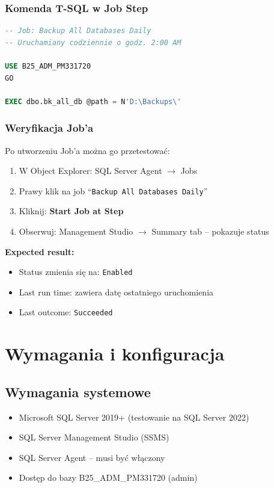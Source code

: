 \documentclass[a4paper,11pt]{article}
\begin{document}
	\subsubsection{Komenda T-SQL w Job Step}
	
	\begin{lstlisting}[language=SQL]
-- Job: Backup All Databases Daily
-- Uruchamiany codziennie o godz. 2:00 AM

USE B25_ADM_PM331720
GO

EXEC dbo.bk_all_db @path = N'D:\Backups\'
	\end{lstlisting}
	
	\subsubsection{Weryfikacja Job'a}
	
	Po utworzeniu Job'a można go przetestować:
	
	\begin{enumerate}
		\item W Object Explorer: SQL Server Agent $\rightarrow$ Jobs
		\item Prawy klik na job ``\texttt{Backup All Databases Daily}''
		\item Kliknij: \textbf{Start Job at Step}
		\item Obserwuj: Management Studio $\rightarrow$ Summary tab -- pokazuje status
	\end{enumerate}
	
	\textbf{Expected result:}
	\begin{itemize}
		\item Status zmienia się na: \texttt{Enabled}
		\item Last run time: zawiera datę ostatniego uruchomienia
		\item Last outcome: \texttt{Succeeded}
	\end{itemize}
	
	\section{Wymagania i konfiguracja}
	
	\subsection{Wymagania systemowe}
	
	\begin{itemize}
		\item Microsoft SQL Server 2019+ (testowanie na SQL Server 2022)
		\item SQL Server Management Studio (SSMS)
		\item SQL Server Agent -- musi być włączony
		\item Dostęp do bazy B25\_ADM\_PM331720 (admin)
	\end{itemize}
	
\end{document}
